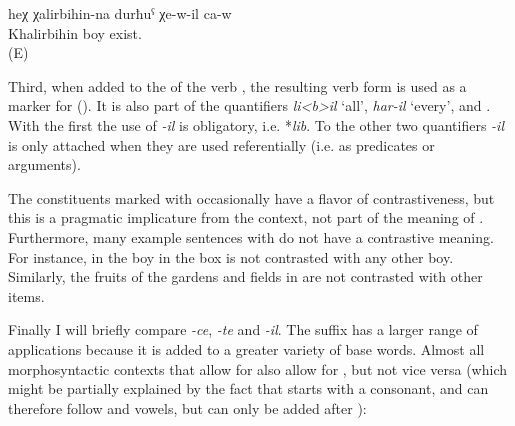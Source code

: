 \begin{exe}
	\ex	\label{ex:The son of Khalirbihin should be there (i.e. be still alive) minor}
	\gll	heχ	χalirbihin-na	durħuˁ	χe-w-il	ca-w\\
			Khalirbihin	boy	exist.	\\
	\glt	{} (E)
\end{exe}
	
Third, when added to the  of the verb  , the resulting verb form is used as a marker for  (). It is also part of the quantifiers \textit{li<b>il} `all', \textit{har-il} `every', and  . With the first  the use of \textit{-il} is obligatory, i.e. *\textit{lib}. To the other two quantifiers \textit{-il} is only attached when they are used referentially (i.e. as predicates or arguments). 

The constituents marked with  occasionally have a flavor of contrastiveness, but this is a pragmatic implicature from the context, not part of the meaning of . Furthermore, many example sentences with  do not have a contrastive meaning. For instance, in  the boy in the box is not contrasted with any other boy. Similarly, the fruits of the gardens and fields in  are not contrasted with other items.

Finally I will briefly compare \textit{-ce}, \textit{-te} and \textit{-il}. The suffix  has a larger range of applications because it is added to a greater variety of base words. Almost all morphosyntactic contexts that allow for  also allow for , but not vice versa (which might be partially explained by the fact that  starts with a consonant, and can therefore follow  and vowels, but  can only be added after ):

